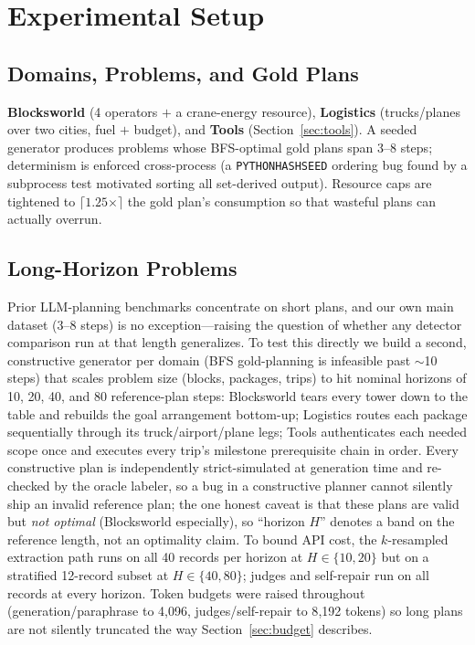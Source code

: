 \documentclass[letterpaper]{article}
\begin{document}
\section{Experimental Setup}

\subsection{Domains, Problems, and Gold Plans}

\textbf{Blocksworld} (4 operators $+$ a crane-energy resource),
\textbf{Logistics} (trucks/planes over two cities, fuel $+$ budget), and
\textbf{Tools} (Section~\ref{sec:tools}). A seeded generator produces
problems whose BFS-optimal gold plans span 3--8 steps; determinism is
enforced cross-process (a \texttt{PYTHONHASHSEED} ordering bug found by a
subprocess test motivated sorting all set-derived output). Resource caps are
tightened to $\lceil 1.25\times\rceil$ the gold plan's consumption so that
wasteful plans can actually overrun.

\subsection{Long-Horizon Problems}
\label{sec:horizonsetup}

Prior LLM-planning benchmarks concentrate on short plans, and our own
main dataset (3--8 steps) is no exception---raising the question of
whether any detector comparison run at that length generalizes. To test
this directly we build a second, constructive generator per domain
(BFS gold-planning is infeasible past $\sim$10 steps) that scales problem
size (blocks, packages, trips) to hit nominal horizons of 10, 20, 40, and
80 reference-plan steps: Blocksworld tears every tower down to the table
and rebuilds the goal arrangement bottom-up; Logistics routes each package
sequentially through its truck/airport/plane legs; Tools authenticates each
needed scope once and executes every trip's milestone prerequisite chain in
order. Every constructive plan is independently strict-simulated at
generation time and re-checked by the oracle labeler, so a bug in a
constructive planner cannot silently ship an invalid reference plan; the
one honest caveat is that these plans are valid but \emph{not optimal}
(Blocksworld especially), so ``horizon $H$'' denotes a band on the
reference length, not an optimality claim. To bound API cost, the
$k$-resampled extraction path runs on all 40 records per horizon at
$H{\in}\{10,20\}$ but on a stratified 12-record subset at
$H{\in}\{40,80\}$; judges and self-repair run on all records at every
horizon. Token budgets were raised throughout (generation/paraphrase to
4{,}096, judges/self-repair to 8{,}192 tokens) so long plans are not
silently truncated the way Section~\ref{sec:budget} describes.
\end{document}
